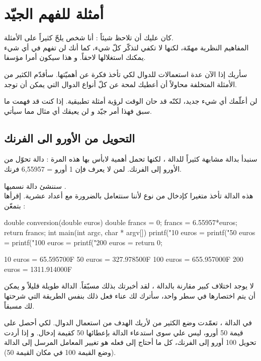\section{أمثلة للفهم الجيّد}

كان عليك أن تلاحظ شيئاً : أنا شخص يلحّ كثيراً على الأمثلة.\\
المفاهيم النظرية مهمّة، لكنها لا تكفي لتذكّر كلّ شيء، كما أنك لن تفهم في أي شيء يمكنك استغلالها لاحقاً. و هذا سيكون أمرا مؤسفا.

سأريك إذا الآن عدة استعمالات للدوال لكي تأخذ فكرة عن أهميّتها. سأقدّم الكثير من الأمثلة المتخلفة محاولاً أن أعطيك لمحة عن كلّ أنواع الدوال التي يمكن أن توجد.

لن أعلّمك أي شيء جديد، لكنّه قد حان الوقت لرؤية أمثلة تطبيقية. إذا كنت قد فهمت ما سبق فهذا أمر جيّد و لن يعيقك أي مثال مما سيأتي.

\subsection{التحويل من الأورو الى الفرنك}

سنبدأ بدالة مشابهة كثيراً للدالة
،
لكنها تحمل أهمية لابأس بها هذه المرة : دالة تحوّل من الأورو إلى الفرنك. لمن لا يعرف فإن 1 أورو = 6,55957 فرنك.

سننشئ دالة نسميها 
.\\
هذه الدالة تأخذ متغيرا كإدخال من نوع 
لأننا سنتعامل بالضرورة مع أعداد عشرية. إقرأها بتمعّن :

\begin{Csource}
double conversion(double euros)
{
	double francs = 0;
	francs = 6.55957*euros;
	return francs;
}
int main(int argc, char * argv[])
{
	printf("10 euros = %
	printf("50 euros = %
	printf("100 euros = %
	printf("200 euros = %
	return 0;
}
\end{Csource}

\begin{Console}
10 euros = 65.595700F
50 euros = 327.978500F
100 euros = 655.957000F
200 euros = 1311.914000F
\end{Console}

لا يوجد اختلاف كبير مقارنة بالدالة 
،
لقد أخبرتك بذلك مسبّقاً. الدالة 
طويلة قليلاً و يمكن أن يتم اختصارها في سطر واحد، سأترك لك عناء فعل ذلك بنفس الطريقة التي شرحتها لك مسبقاً.

في الدالة
،
تعمّدت وضع الكثير من
لأريك الهدف من استعمال الدوال. لكي أحصل على قيمة 50 أورو، ليس علي سوى استدعاء الدالة 
بإعطائها 50 كقيمة إدخال. و إذا أردت تحويل 100 أورو إلى الفرنك، كل ما أحتاج إلى فعله هو تغيير المعامل المرسل إلى الدالة (وضع القيمة 100 في مكان القيمة 50).

